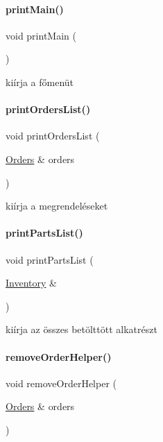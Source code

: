 \paragraph{\texorpdfstring{printMain()}{printMain()}}
{\footnotesize\ttfamily void print\+Main (\begin{DoxyParamCaption}{ }\end{DoxyParamCaption})}



kiírja a főmenüt 

\mbox{\label{_menu_8h_a2279d427508487e2c7194ba68588445d}} 
\paragraph{\texorpdfstring{printOrdersList()}{printOrdersList()}}
{\footnotesize\ttfamily void print\+Orders\+List (\begin{DoxyParamCaption}\item[{\mbox{\hyperlink{class_orders}{Orders}} \&}]{orders }\end{DoxyParamCaption})}



kiírja a megrendeléseket 

\mbox{\label{_menu_8h_a54c74422af05849f9d508c0a5ccd468b}} 
\paragraph{\texorpdfstring{printPartsList()}{printPartsList()}}
{\footnotesize\ttfamily void print\+Parts\+List (\begin{DoxyParamCaption}\item[{\mbox{\hyperlink{class_inventory}{Inventory}} \&}]{ }\end{DoxyParamCaption})}



kiírja az összes betölttött alkatrészt 

\mbox{\label{_menu_8h_aed744d8c7e74c041565714ecfb656f0b}} 
\paragraph{\texorpdfstring{removeOrderHelper()}{removeOrderHelper()}}
{\footnotesize\ttfamily void remove\+Order\+Helper (\begin{DoxyParamCaption}\item[{\mbox{\hyperlink{class_orders}{Orders}} \&}]{orders }\end{DoxyParamCaption})}

